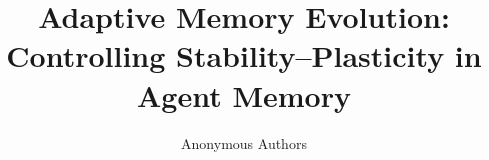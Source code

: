 \documentclass{article}
\title{Adaptive Memory Evolution:\\Controlling Stability--Plasticity in Agent Memory}
\author{Anonymous Authors}
\begin{document}
\maketitle







\label{main:end}
\clearpage


\clearpage
\appendix

\end{document}
